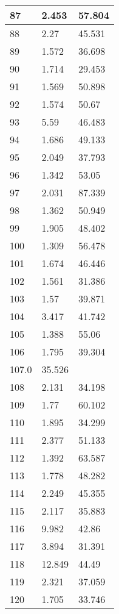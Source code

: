 \begin{table}[!ht]
\begin{tabular}{|l|l|l|}
        87 & 2.453 & 57.804 \\ \hline
        88 & 2.27 & 45.531 \\ \hline
        89 & 1.572 & 36.698 \\ \hline
        90 & 1.714 & 29.453 \\ \hline
        91 & 1.569 & 50.898 \\ \hline
        92 & 1.574 & 50.67 \\ \hline
        93 & 5.59 & 46.483 \\ \hline
        94 & 1.686 & 49.133 \\ \hline
        95 & 2.049 & 37.793 \\ \hline
        96 & 1.342 & 53.05 \\ \hline
        97 & 2.031 & 87.339 \\ \hline
        98 & 1.362 & 50.949 \\ \hline
        99 & 1.905 & 48.402 \\ \hline
        100 & 1.309 & 56.478 \\ \hline
        101 & 1.674 & 46.446 \\ \hline
        102 & 1.561 & 31.386 \\ \hline
        103 & 1.57 & 39.871 \\ \hline
        104 & 3.417 & 41.742 \\ \hline
        105 & 1.388 & 55.06 \\ \hline
        106 & 1.795 & 39.304 \\ \hline
        107.0 & 35.526 & ~ \\ \hline
        108 & 2.131 & 34.198 \\ \hline
        109 & 1.77 & 60.102 \\ \hline
        110 & 1.895 & 34.299 \\ \hline
        111 & 2.377 & 51.133 \\ \hline
        112 & 1.392 & 63.587 \\ \hline
        113 & 1.778 & 48.282 \\ \hline
        114 & 2.249 & 45.355 \\ \hline
        115 & 2.117 & 35.883 \\ \hline
        116 & 9.982 & 42.86 \\ \hline
        117 & 3.894 & 31.391 \\ \hline
        118 & 12.849 & 44.49 \\ \hline
        119 & 2.321 & 37.059 \\ \hline
        120 & 1.705 & 33.746 \\ \hline

\end{tabular}
\end{table}
